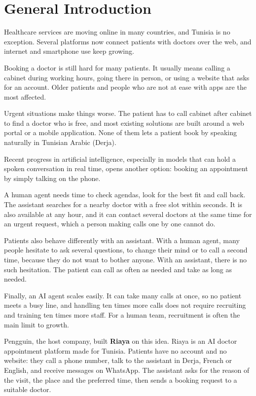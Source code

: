 \chapter*{General Introduction}

\begingroup
\setlength{\parindent}{12mm}
\setlength{\parskip}{3pt}

Healthcare services are moving online in many countries, and Tunisia is no exception. Several platforms now connect patients with doctors over the web, and internet and smartphone use keep growing.

Booking a doctor is still hard for many patients. It usually means calling a cabinet during working hours, going there in person, or using a website that asks for an account. Older patients and people who are not at ease with apps are the most affected.

Urgent situations make things worse. The patient has to call cabinet after cabinet to find a doctor who is free, and most existing solutions are built around a web portal or a mobile application. None of them lets a patient book by speaking naturally in Tunisian Arabic (Derja).

Recent progress in artificial intelligence, especially in models that can hold a spoken conversation in real time, opens another option: booking an appointment by simply talking on the phone.

A human agent needs time to check agendas, look for the best fit and call back. The assistant searches for a nearby doctor with a free slot within seconds. It is also available at any hour, and it can contact several doctors at the same time for an urgent request, which a person making calls one by one cannot do.

Patients also behave differently with an assistant. With a human agent, many people hesitate to ask several questions, to change their mind or to call a second time, because they do not want to bother anyone. With an assistant, there is no such hesitation. The patient can call as often as needed and take as long as needed.

Finally, an AI agent scales easily. It can take many calls at once, so no patient meets a busy line, and handling ten times more calls does not require recruiting and training ten times more staff. For a human team, recruitment is often the main limit to growth.

Pengguin, the host company, built \textbf{Riaya} on this idea. Riaya is an AI doctor appointment platform made for Tunisia. Patients have no account and no website: they call a phone number, talk to the assistant in Derja, French or English, and receive messages on WhatsApp. The assistant asks for the reason of the visit, the place and the preferred time, then sends a booking request to a suitable doctor.

